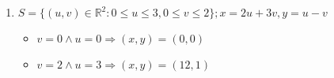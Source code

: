 \documentclass[../practica_09.tex]{subfiles}
\begin{document}
    \begin{enumerate}
        \item $ S = \{(u,v) \in \mathbb{R}^2: 0 \leq u \leq 3, 0 \leq v \leq 2\}; x = 2u + 3v, y = u - v$
        
            \begin{itemize}
                \item $v=0 \wedge u = 0 \Rightarrow (x,y) = (0,0)$
                \item $v=2 \wedge u = 3 \Rightarrow (x,y) = (12,1)$
            \end{itemize}
            
            

    \end{enumerate}
\end{document}
